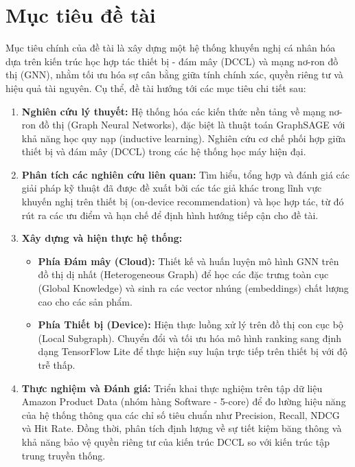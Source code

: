 \section{Mục tiêu đề tài}

Mục tiêu chính của đề tài là xây dựng một hệ thống khuyến nghị cá nhân hóa dựa trên kiến trúc học hợp tác thiết bị - đám mây (DCCL) và mạng nơ-ron đồ thị (GNN), nhằm tối ưu hóa sự cân bằng giữa tính chính xác, quyền riêng tư và hiệu quả tài nguyên. Cụ thể, đề tài hướng tới các mục tiêu chi tiết sau:

\begin{enumerate}
    \item \textbf{Nghiên cứu lý thuyết:} Hệ thống hóa các kiến thức nền tảng về mạng nơ-ron đồ thị (Graph Neural Networks), đặc biệt là thuật toán GraphSAGE với khả năng học quy nạp (inductive learning). Nghiên cứu cơ chế phối hợp giữa thiết bị và đám mây (DCCL) trong các hệ thống học máy hiện đại.
    \item \textbf{Phân tích các nghiên cứu liên quan:} Tìm hiểu, tổng hợp và đánh giá các giải pháp kỹ thuật đã được đề xuất bởi các tác giả khác trong lĩnh vực khuyến nghị trên thiết bị (on-device recommendation) và học hợp tác, từ đó rút ra các ưu điểm và hạn chế để định hình hướng tiếp cận cho đề tài.
    \item \textbf{Xây dựng và hiện thực hệ thống:} 
    \begin{itemize}
        \item \textbf{Phía Đám mây (Cloud):} Thiết kế và huấn luyện mô hình GNN trên đồ thị dị nhất (Heterogeneous Graph) để học các đặc trưng toàn cục (Global Knowledge) và sinh ra các vector nhúng (embeddings) chất lượng cao cho các sản phẩm.
        \item \textbf{Phía Thiết bị (Device):} Hiện thực luồng xử lý trên đồ thị con cục bộ (Local Subgraph). Chuyển đổi và tối ưu hóa mô hình ranking sang định dạng TensorFlow Lite để thực hiện suy luận trực tiếp trên thiết bị với độ trễ thấp.
    \end{itemize}
    \item \textbf{Thực nghiệm và Đánh giá:} Triển khai thực nghiệm trên tập dữ liệu Amazon Product Data (nhóm hàng Software - 5-core) để đo lường hiệu năng của hệ thống thông qua các chỉ số tiêu chuẩn như Precision, Recall, NDCG và Hit Rate. Đồng thời, phân tích định lượng về sự tiết kiệm băng thông và khả năng bảo vệ quyền riêng tư của kiến trúc DCCL so với kiến trúc tập trung truyền thống.
\end{enumerate}

